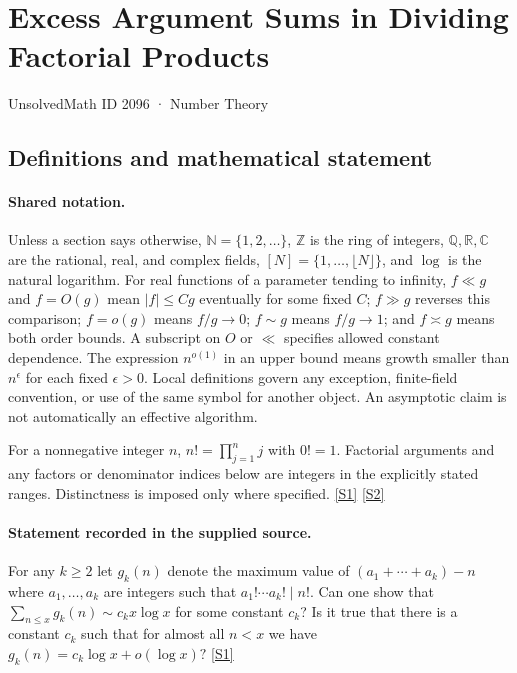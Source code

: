 \documentclass[11pt,a4paper]{article}
\newcommand{\N}{\mathbb{N}}
\newcommand{\Z}{\mathbb{Z}}
\newcommand{\Q}{\mathbb{Q}}
\newcommand{\R}{\mathbb{R}}
\newcommand{\C}{\mathbb{C}}
\newcommand{\sref}[2]{\hyperlink{source:#1:#2}{[S#2]}}
\begin{document}

\setcounter{section}{2095}

\section{Excess Argument Sums in Dividing Factorial Products}\label{2096}

{\small\sffamily UnsolvedMath ID 2096 · Number Theory}

\subsection{Definitions and mathematical statement}

\paragraph{Shared notation.}Unless a section says otherwise, $\N=\{1,2,\ldots\}$,
$\Z$ is the ring of integers, $\Q,\R,\C$ are the rational, real, and complex
fields, $[N]=\{1,\ldots,\lfloor N\rfloor\}$, and $\log$ is the natural
logarithm. For real functions of a parameter tending to infinity,
$f\ll g$ and $f=O(g)$ mean $|f|\leq Cg$ eventually for some fixed $C$;
$f\gg g$ reverses this comparison; $f=o(g)$ means $f/g\to0$;
$f\sim g$ means $f/g\to1$; and $f\asymp g$ means both order bounds.
A subscript on $O$ or $\ll$ specifies allowed constant dependence.
The expression $n^{o(1)}$ in an upper bound means growth smaller than
$n^\epsilon$ for each fixed $\epsilon>0$. Local definitions govern any
exception, finite-field convention, or use of the same symbol for another
object. An asymptotic claim is not automatically an effective algorithm.



For a nonnegative integer $n$, $n!=\prod_{j=1}^n j$ with $0!=1$. Factorial arguments and any factors or denominator indices below are integers in the explicitly stated ranges. Distinctness is imposed only where specified. \sref{2096}{1} \sref{2096}{2}

\paragraph{Statement recorded in the supplied source.}
For any $k\geq 2$ let $g_k(n)$ denote the maximum value of $ (a_1+\cdots+a_k)-n $ where $a_1,\ldots,a_k$ are integers such that $a_1!\cdots a_k! \mid n!$. Can one show that $ \sum_{n\leq x}g_k(n) \sim c_k x\log x $ for some constant $c_k$? Is it true that there is a constant $c_k$ such that for almost all $n<x$ we have $ g_k(n)=c_k\log x+o(\log x)? $ \sref{2096}{1}
\end{document}
